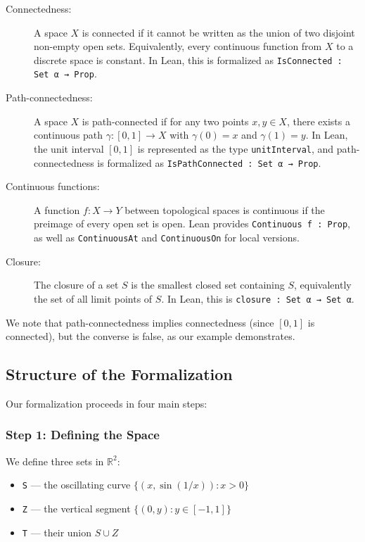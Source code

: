 \begin{description}
  \item[Connectedness:] A space $X$ is connected if it cannot be written as the union of
        two disjoint non-empty open sets. Equivalently, every continuous function from $X$
        to a discrete space is constant. In Lean, this is formalized
        as \lstinline[language=lean]|IsConnected : Set α → Prop|.
  \item[Path-connectedness:] A space $X$ is path-connected if for any two points
        $x, y \in X$, there exists a continuous path $\gamma : [0,1] \to X$
        with $\gamma(0) = x$ and $\gamma(1) = y$. In Lean, the unit interval $[0,1]$
        is represented as the type \lstinline[language=lean]|unitInterval|,
        and path-connectedness is formalized as \lstinline[language=lean]|IsPathConnected : Set α → Prop|.
  \item[Continuous functions:] A function $f : X \to Y$ between topological spaces
        is continuous if the preimage of every open set is open. Lean provides
        \lstinline[language=lean]|Continuous f : Prop|, as well as \lstinline[language=lean]|ContinuousAt|
        and \lstinline[language=lean]|ContinuousOn| for local versions.
  \item[Closure:] The closure of a set $S$ is the smallest closed set containing $S$,
        equivalently the set of all limit points of $S$. In Lean, this is
        \lstinline[language=lean]|closure : Set α → Set α|.
\end{description}

We note that path-connectedness implies connectedness (since $[0,1]$ is connected),
but the converse is false, as our example demonstrates.

\subsection{Structure of the Formalization}

Our formalization proceeds in four main steps:

\subsubsection{Step 1: Defining the Space}

We define three sets in $\mathbb{R}^2$:
\begin{itemize}
  \item \lstinline[language=lean]|S| --- the oscillating curve $\{(x, \sin(1/x)) : x > 0\}$
  \item \lstinline[language=lean]|Z| --- the vertical segment $\{(0, y) : y \in [-1, 1]\}$
  \item \lstinline[language=lean]|T| --- their union $S \cup Z$
\end{itemize}

